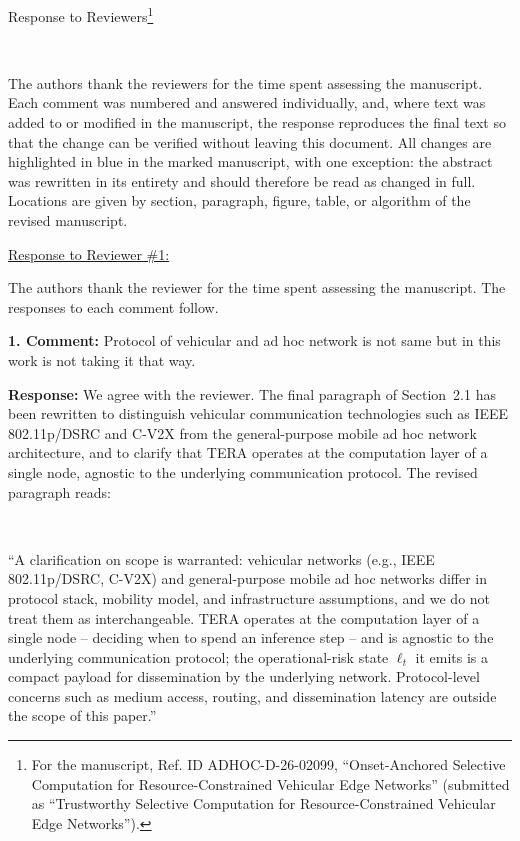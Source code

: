 \documentclass[1p,12pt,authoryear]{elsarticle}
\begin{document}
\makeatletter
\def\@xfootnote[#1]{%
  \protected@xdef\@thefnmark{#1}%
  \@footnotemark\@footnotetext}
\makeatother

\begin{center}
\huge Response to Reviewers\footnote[*]{For the manuscript, Ref. ID ADHOC-D-26-02099, ``Onset-Anchored Selective Computation for Resource-Constrained Vehicular Edge Networks'' (submitted as ``Trustworthy Selective Computation for Resource-Constrained Vehicular Edge Networks'').}
\end{center}

~

\noindent The authors thank the reviewers for the time spent assessing the manuscript. Each comment was numbered and answered individually, and, where text was added to or modified in the manuscript, the response reproduces the final text so that the change can be verified without leaving this document. All changes are highlighted in blue in the marked manuscript, with one exception: the abstract was rewritten in its entirety and should therefore be read as changed in full. Locations are given by section, paragraph, figure, table, or algorithm of the revised manuscript.

\newpage


\begin{large}
\noindent \underline{Response to Reviewer \#1:}
\end{large}

\vspace{10pt}

\noindent The authors thank the reviewer for the time spent assessing the manuscript. The responses to each comment follow.

\vspace{0.5cm}
\noindent \textbf{1. Comment:} Protocol of vehicular and ad hoc network is not same but in this work is not taking it that way.

\vspace{2mm}
\noindent \textbf{Response:} We agree with the reviewer. The final paragraph of Section~2.1 has been rewritten to distinguish vehicular communication technologies such as IEEE 802.11p/DSRC and C-V2X from the general-purpose mobile ad hoc network architecture, and to clarify that TERA operates at the computation layer of a single node, agnostic to the underlying communication protocol. The revised paragraph reads:

~

``A clarification on scope is warranted: vehicular networks (e.g., IEEE 802.11p/DSRC, C-V2X) and general-purpose mobile ad hoc networks differ in protocol stack, mobility model, and infrastructure assumptions, and we do not treat them as interchangeable. TERA operates at the computation layer of a single node -- deciding when to spend an inference step -- and is agnostic to the underlying communication protocol; the operational-risk state $\ell_t$ it emits is a compact payload for dissemination by the underlying network. Protocol-level concerns such as medium access, routing, and dissemination latency are outside the scope of this paper.''
\end{document}
